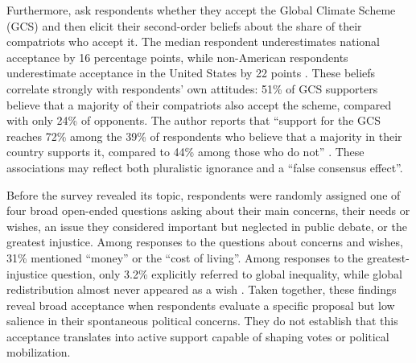 \documentclass[11pt,a4paper]{article}
\begin{document}

Furthermore, \citet{fabre_public_2026} ask respondents whether they accept the Global Climate Scheme (GCS) and then elicit their second-order beliefs about the share of their compatriots who accept it. The median respondent underestimates national acceptance by 16 percentage points, while non-American respondents underestimate acceptance in the United States by 22 points \citep[Figure S30]{fabre_public_2026}. These beliefs correlate strongly with respondents' own attitudes: 51\% of GCS supporters believe that a majority of their compatriots also accept the scheme, compared with only 24\% of opponents. The author reports that ``support for the GCS reaches 72\% among the 39\% of respondents who believe that a majority in their country supports it, compared to 44\% among those who do not'' \citep[Figure S30]{fabre_public_2026}. These associations may reflect both pluralistic ignorance and a ``false consensus effect''.


Before the survey revealed its topic, respondents were randomly assigned one of four broad open-ended questions asking about their main concerns, their needs or wishes, an issue they considered important but neglected in public debate, or the greatest injustice. Among responses to the questions about concerns and wishes, 31\% mentioned ``money'' or the ``cost of living''. Among responses to the greatest-injustice question, only 3.2\% explicitly referred to global inequality, while global redistribution almost never appeared as a wish \citep[Figure 3]{fabre_public_2026}. Taken together, these findings reveal broad acceptance when respondents evaluate a specific proposal but low salience in their spontaneous political concerns. They do not establish that this acceptance translates into active support capable of shaping votes or political mobilization.


%
\end{document}

